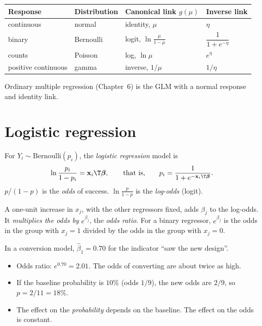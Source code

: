 \begin{center}
\begin{tabular}{llll}
\toprule
Response & Distribution & Canonical link $g(\mu)$ & Inverse link\\
\midrule
continuous & normal & identity, $\mu$ & $\eta$\\
binary & Bernoulli & logit, $\ln\frac\mu{1-\mu}$ & $\dfrac1{1+e^{-\eta}}$\\
counts & Poisson & log, $\ln\mu$ & $e^\eta$\\
positive continuous & gamma & inverse, $1/\mu$ & $1/\eta$\\
\bottomrule
\end{tabular}
\end{center}

Ordinary multiple regression (Chapter~6) is the GLM with a normal response and identity link.

\section{Logistic regression}

For $Y_i\sim\mathrm{Bernoulli}(p_i)$, the \emph{logistic regression} model is
\[ \ln\frac{p_i}{1-p_i}=\mathbf{x}_i\T\boldsymbol\beta,\qquad\text{that is,}\qquad p_i=\frac1{1+e^{-\mathbf{x}_i\T\boldsymbol\beta}}. \]
$p/(1-p)$ is the \emph{odds} of success. $\ln\frac p{1-p}$ is the \emph{log-odds} (logit).

\begin{theorem}\label{thm:logit-interp}
A one-unit increase in $x_j$, with the other regressors fixed, adds $\beta_j$ to the log-odds. It \emph{multiplies the odds by} $e^{\beta_j}$, the \emph{odds ratio}. For a binary regressor, $e^{\beta_j}$ is the odds in the group with $x_j=1$ divided by the odds in the group with $x_j=0$.
\end{theorem}

\begin{example}
In a conversion model, $\hat\beta_1=0.70$ for the indicator ``saw the new design''.
\begin{itemize}
  \item Odds ratio: $e^{0.70}=2.01$. The odds of converting are about twice as high.
  \item If the baseline probability is $10\%$ (odds $1/9$), the new odds are $2/9$, so $p=2/11=18\%$.
  \item The effect on the \emph{probability} depends on the baseline. The effect on the odds is constant.
\end{itemize}
\end{example}

